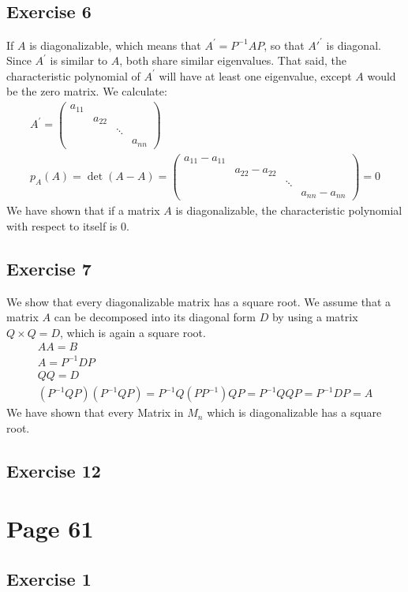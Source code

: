 \subsection{Exercise 6}
If $A$ is diagonalizable, which means that $A^{'} = P^{-1}AP$, so that $A'^{'}$ is diagonal. 
Since $A^{'}$ is similar to $A$, both share similar eigenvalues. That said, the characteristic polynomial of $A^{'}$ will have at least one eigenvalue, except $A$ would be the zero matrix.
We calculate:
\begin{gather*}
A^{'} = \left( \begin{array}{cccc}
a_{11}& & &  \\
& a_{22}& &  \\
& & \ddots&  \\
& & & a_{nn}
\end{array} \right) \\
p_{A}(A) = \det (A - A) =
\left( \begin{array}{cccc}
a_{11}- a_{11}& & &  \\
& a_{22} - a_{22}& &  \\
& & \ddots&  \\
& & & a_{nn} - a_{nn}
\end{array} \right) =
0
\end{gather*}
We have shown that if a matrix $A$ is diagonalizable, the characteristic polynomial with respect to itself is $0$.
\subsection{Exercise 7}
We show that every diagonalizable matrix has a square root. We assume that a matrix $A$ can be decomposed into its diagonal form $D$ by using a matrix $Q \times Q =D$, which is again a square root.
\begin{gather*}
A A = B \\
A = P^{-1} D P \\
Q Q = D\\
(P^{-1} Q P)(P^{-1} Q P) = P^{-1} Q (PP^{-1}) Q P = P^{-1} QQ P = P^{-1} D P = A
\end{gather*}
We have shown that every Matrix in $M_n$ which is diagonalizable has a square root.
\subsection{Exercise 12}


\section{Page 61}
\subsection{Exercise 1}